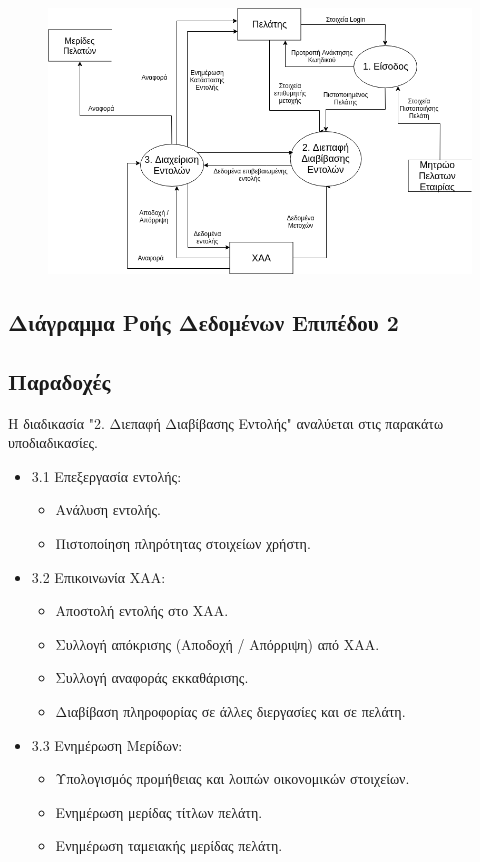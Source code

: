 \documentclass{article}
\begin{document}
	\begin{figure}[!h]
		\includegraphics[width=\linewidth]{../Structured_Analysis/Level_1_Diagram.png}
	\end{figure}

	\newpage
	\subsection{Διάγραμμα Ροής Δεδομένων Επιπέδου 2}
	\subsection*{Παραδοχές}
	Η διαδικασία "2. Διεπαφή Διαβίβασης Εντολής" αναλύεται στις παρακάτω υποδιαδικασίες.
	\begin{itemize}
		\item 3.1 Επεξεργασία εντολής: 
			\begin{itemize}
				\item Ανάλυση εντολής.
				\item Πιστοποίηση πληρότητας στοιχείων χρήστη.
			\end{itemize}
		

		\item 3.2 Επικοινωνία ΧΑΑ:
			\begin{itemize}
				\item Αποστολή εντολής στο ΧΑΑ.
				\item Συλλογή απόκρισης (Αποδοχή / Απόρριψη) από ΧΑΑ.
				\item Συλλογή αναφοράς εκκαθάρισης.
				\item Διαβίβαση πληροφορίας σε άλλες διεργασίες και σε πελάτη.
			\end{itemize}

		\item 3.3 Ενημέρωση Μερίδων:
		\begin{itemize}
			\item Υπολογισμός προμήθειας και λοιπών οικονομικών στοιχείων.
			\item Ενημέρωση μερίδας τίτλων πελάτη.
			\item Ενημέρωση ταμειακής μερίδας πελάτη.
		\end{itemize}
	\end{itemize}
\end{document}
